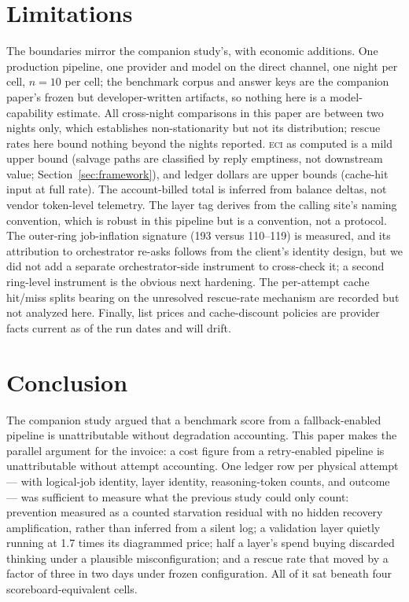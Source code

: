 \documentclass[11pt]{article}
\newcommand{\eci}{\textsc{eci}}
\begin{document}
\section{Limitations}\label{sec:limitations}

The boundaries mirror the companion study's, with economic additions.
One production pipeline, one provider and model on the direct channel,
one night per cell, $n{=}10$ per cell; the benchmark corpus and answer
keys are the companion paper's frozen but developer-written artifacts,
so nothing here is a model-capability estimate. All cross-night
comparisons in this paper are between two nights only, which
establishes non-stationarity but not its distribution; rescue rates
here bound nothing beyond the nights reported. \eci{} as computed is a
mild upper bound (salvage paths are classified by reply emptiness, not
downstream value; Section~\ref{sec:framework}), and ledger dollars are
upper bounds (cache-hit input at full rate). The account-billed total
is inferred from balance deltas, not vendor token-level telemetry. The
layer tag derives from the calling site's naming convention, which is
robust in this pipeline but is a convention, not a protocol. The
outer-ring job-inflation signature (193 versus 110--119) is measured,
and its attribution to orchestrator re-asks follows from the client's
identity design, but we did not add a separate orchestrator-side
instrument to cross-check it; a second ring-level instrument is the
obvious next hardening. The per-attempt cache hit/miss splits bearing
on the unresolved rescue-rate mechanism are recorded but not analyzed
here. Finally, list prices and cache-discount policies are provider
facts current as of the run dates and will drift.

\section{Conclusion}

The companion study argued that a benchmark score from a
fallback-enabled pipeline is unattributable without degradation
accounting. This paper makes the parallel argument for the invoice: a
cost figure from a retry-enabled pipeline is unattributable without
attempt accounting. One ledger row per physical attempt --- with
logical-job identity, layer identity, reasoning-token counts, and
outcome --- was sufficient to measure what the previous study could
only count: prevention measured as a counted starvation residual with
no hidden recovery amplification, rather than inferred from a silent
log; a validation layer quietly running at 1.7 times its diagrammed
price;
half a layer's spend buying discarded thinking under a plausible
misconfiguration; and a rescue rate that moved by a factor of three in
two days under frozen configuration. All of it sat beneath four
scoreboard-equivalent cells.
\end{document}
